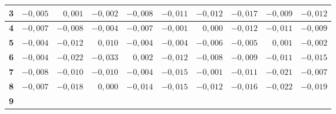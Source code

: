 \begin{table} [htbp]
{\begin{tabular}{|c|rrr|rrr|rrr|}
			\textbf{3}                  		& 
			\multicolumn{1}{r|}{$-0,005$}       & \multicolumn{1}{r|}{$ 0,001$}       & $-0,002$                            & \multicolumn{1}{r|}{$-0,008$}       & \multicolumn{1}{r|}{$-0,011$}       & $-0,012$                            & \multicolumn{1}{r|}{$-0,017$}       & \multicolumn{1}{r|}{$-0,009$}       & $-0,012$                            \\ \hline
			\textbf{4}                  		& 
			\multicolumn{1}{r|}{$-0,007$}       & \multicolumn{1}{r|}{$-0,008$}       & $-0,004$                            & \multicolumn{1}{r|}{$-0,007$}       & \multicolumn{1}{r|}{$-0,001$}       & $ 0,000$                            & \multicolumn{1}{r|}{$-0,012$}       & \multicolumn{1}{r|}{$-0,011$}       & $-0,009$                            \\ \hline
			\textbf{5}                  		& 
			\multicolumn{1}{r|}{$-0,004$}       & \multicolumn{1}{r|}{$-0,012$}       & $ 0,010$                            & \multicolumn{1}{r|}{$-0,004$}       & \multicolumn{1}{r|}{$-0,004$}       & $-0,006$                            & \multicolumn{1}{r|}{$-0,005$}       & \multicolumn{1}{r|}{$ 0,001$}       & $-0,002$                            \\ \hline
			\textbf{6}                	 		 & 
			\multicolumn{1}{r|}{$-0,004$}       & \multicolumn{1}{r|}{$-0,022$}       & $-0,033$                            & \multicolumn{1}{r|}{$ 0,002$}       & \multicolumn{1}{r|}{$-0,012$}       & $-0,008$                            & \multicolumn{1}{r|}{$-0,009$}       & \multicolumn{1}{r|}{$-0,011$}       & $-0,015$                            \\ \hline
			\textbf{7}                  		& 
			\multicolumn{1}{r|}{$-0,008$}       & \multicolumn{1}{r|}{$-0,010$}       & $-0,010$                            & \multicolumn{1}{r|}{$-0,004$}       & \multicolumn{1}{r|}{$-0,015$}       & $-0,001$                            & \multicolumn{1}{r|}{$-0,011$}       & \multicolumn{1}{r|}{$-0,021$}       & $-0,007$                            \\ \hline
			\textbf{8}                  		& 
			\multicolumn{1}{r|}{$-0,007$}       & \multicolumn{1}{r|}{$-0,018$}       & $ 0,000$                            & \multicolumn{1}{r|}{$-0,014$}       & \multicolumn{1}{r|}{$-0,015$}       & $-0,012$                            & \multicolumn{1}{r|}{$-0,016$}       & \multicolumn{1}{r|}{$-0,022$}       & $-0,019$                            \\ \hline
			\textbf{9}                 			& 

\end{tabular}}
\end{table}
